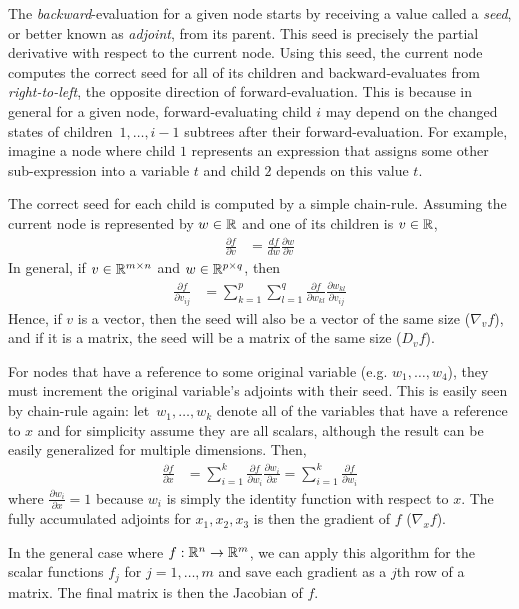 The \emph{backward}-evaluation for a given node starts by 
receiving a value called a \emph{seed}, or better known as \emph{adjoint}, from its parent.
This seed is precisely the partial derivative with respect to the current node.
Using this seed, the current node computes the correct seed for all of its children and 
backward-evaluates from \emph{right-to-left}, the opposite direction of forward-evaluation.
This is because in general for a given node, forward-evaluating child $i$ may depend
on the changed states of children~$1,\ldots,i-1$ subtrees after their forward-evaluation.
For example, imagine a node where child $1$ represents an expression that 
assigns some other sub-expression into a variable $t$ and child $2$ depends on this value $t$.

The correct seed for each child is computed by a simple chain-rule.
Assuming the current node is represented by $w \in \mathbb{R}$ and one of its children is $v \in \mathbb{R}$,
\begin{align*}
    \frac{\partial f}{\partial v} &=
        \frac{df}{dw} \frac{\partial w}{\partial v}
\end{align*}
In general, if $v \in \mathbb{R}^{m \times n}$ and $w \in \mathbb{R}^{p \times q}$, then
\begin{align*}
    \frac{\partial f}{\partial v_{ij}} &=
        \sum\limits_{k=1}^p \sum\limits_{l=1}^q 
        \frac{\partial f}{\partial w_{kl}} \frac{\partial w_{kl}}{\partial v_{ij}}
\end{align*}
Hence, if $v$ is a vector, then the seed will also be a vector of the same size ($\nabla_v f$),
and if it is a matrix, the seed will be a matrix of the same size ($D_v f$).

For nodes that have a reference to some original variable (e.g. $w_1,\ldots,w_4$),
they must increment the original variable's adjoints with their seed.
This is easily seen by chain-rule again: let~$w_1, \ldots, w_k$ denote all of the variables that have a 
reference to $x$ and for simplicity assume they are all scalars, 
although the result can be easily generalized for multiple dimensions.
Then,
\begin{align*}
    \frac{\partial f}{\partial x} 
    &=  \sum\limits_{i=1}^k
        \frac{\partial f}{\partial w_{i}} \frac{\partial w_{i}}{\partial x}
    =   \sum\limits_{i=1}^k
        \frac{\partial f}{\partial w_{i}}
\end{align*}
where $\frac{\partial w_i}{\partial x} = 1$ because $w_i$ is simply the identity function with respect to $x$.
The fully accumulated adjoints for $x_1, x_2, x_3$ is then the gradient of $f$ ($\nabla_x f$).

In the general case where $f: \mathbb{R}^n \to \mathbb{R}^m$,
we can apply this algorithm for the scalar functions $f_j$ for $j = 1,\ldots,m$ and
save each gradient as a $j$th row of a matrix.
The final matrix is then the Jacobian of $f$.
